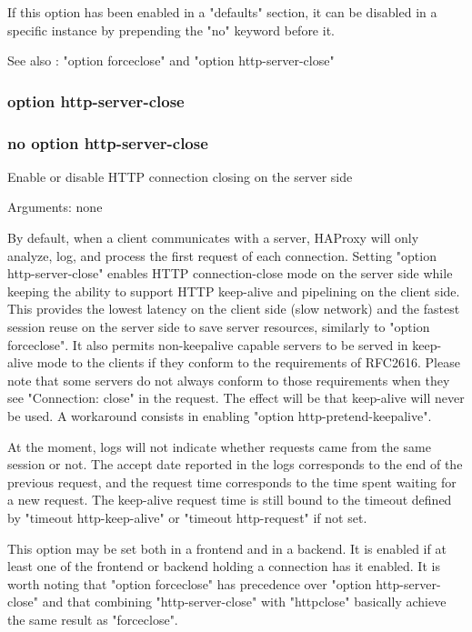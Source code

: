   If this option has been enabled in a "defaults" section, it can be disabled
  in a specific instance by prepending the "no" keyword before it.

  See also : "option forceclose" and "option http-server-close"

\subsubsection{option http-server-close}
\subsubsection{no option http-server-close}


  Enable or disable HTTP connection closing on the server side


  Arguments: none

  By default, when a client communicates with a server, HAProxy will only
  analyze, log, and process the first request of each connection. Setting
  "option http-server-close" enables HTTP connection-close mode on the server
  side while keeping the ability to support HTTP keep-alive and pipelining on
  the client side.  This provides the lowest latency on the client side (slow
  network) and the fastest session reuse on the server side to save server
  resources, similarly to "option forceclose". It also permits non-keepalive
  capable servers to be served in keep-alive mode to the clients if they
  conform to the requirements of RFC2616. Please note that some servers do not
  always conform to those requirements when they see "Connection: close" in the
  request. The effect will be that keep-alive will never be used. A workaround
  consists in enabling "option http-pretend-keepalive".

  At the moment, logs will not indicate whether requests came from the same
  session or not. The accept date reported in the logs corresponds to the end
  of the previous request, and the request time corresponds to the time spent
  waiting for a new request. The keep-alive request time is still bound to the
  timeout defined by "timeout http-keep-alive" or "timeout http-request" if
  not set.

  This option may be set both in a frontend and in a backend. It is enabled if
  at least one of the frontend or backend holding a connection has it enabled.
  It is worth noting that "option forceclose" has precedence over "option
  http-server-close" and that combining "http-server-close" with "httpclose"
  basically achieve the same result as "forceclose".

